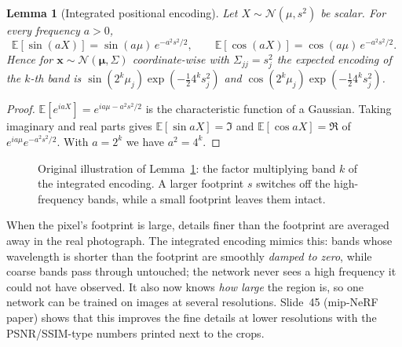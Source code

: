 \documentclass[11pt,a4paper]{article}
\newcommand{\E}{\mathbb{E}}
\theoremstyle{definition}
\theoremstyle{plain}
\newtheorem{lemma}[definition]{Lemma}
\theoremstyle{remark}
\begin{document}
\begin{lemma}[Integrated positional encoding]\label{lem:ipe}
Let $X\sim\mathcal N(\mu,s^2)$ be scalar. For every frequency $a>0$,
\[
\E[\sin(aX)]=\sin(a\mu)\,e^{-a^2s^2/2},\qquad\E[\cos(aX)]=\cos(a\mu)\,e^{-a^2s^2/2}.
\]
Hence for $\boldsymbol x\sim\mathcal N(\boldsymbol\mu,\Sigma)$ coordinate-wise with $\Sigma_{jj}=s_j^2$ the expected encoding of the $k$-th band is $\sin(2^k\mu_j)\exp(-\tfrac12 4^ks_j^2)$ and $\cos(2^k\mu_j)\exp(-\tfrac12 4^ks_j^2)$.
\end{lemma}
\begin{proof}
$\E[e^{iaX}]=e^{ia\mu-a^2s^2/2}$ is the characteristic function of a Gaussian. Taking imaginary and real parts gives $\E[\sin aX]=\Im$ and $\E[\cos aX]=\Re$ of $e^{ia\mu}e^{-a^2s^2/2}$. With $a=2^k$ we have $a^2=4^k$.
\end{proof}

\begin{figure}[H]
\centering
{}
\caption{Original illustration of Lemma~\ref{lem:ipe}: the factor multiplying band $k$ of the integrated encoding. A larger footprint $s$ switches off the high-frequency bands, while a small footprint leaves them intact.}
\end{figure}

\begin{intuition}
When the pixel's footprint is large, details finer than the footprint are averaged away in the real photograph. The integrated encoding mimics this: bands whose wavelength is shorter than the footprint are smoothly \emph{damped to zero}, while coarse bands pass through untouched; the network never sees a high frequency it could not have observed. It also now knows \emph{how large} the region is, so one network can be trained on images at several resolutions. Slide~45 (mip-NeRF paper) shows that this improves the fine details at lower resolutions with the PSNR/SSIM-type numbers printed next to the crops.
\end{intuition}
\end{document}
